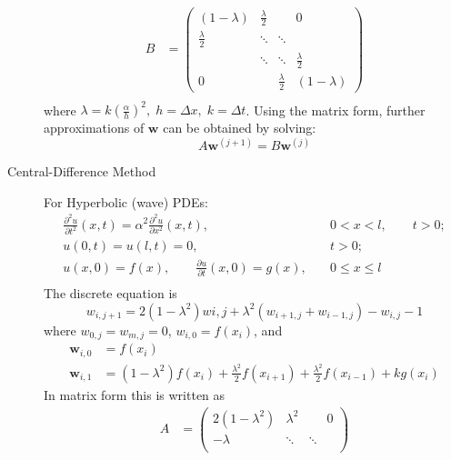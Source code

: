 \documentclass[8pt]{article}
\begin{document}
\begin{multicols}{2}
\begin{description}
\begin{equation*}
\begin{aligned}
        B&=
        \begin{pmatrix}
          (1-\lambda) & \frac{\lambda}{2} & & 0\\
          \frac{\lambda}{2} & \ddots & \ddots & \\
          & \ddots & \ddots & \frac{\lambda}{2}\\
          0 & & \frac{\lambda}{2} & (1-\lambda)
        \end{pmatrix} \\
      \end{aligned}
    \end{equation*}
    where $\lambda = k\left(\frac{\alpha}{h}\right)^2,\;h=\Delta
    x,\;k=\Delta t$. Using the matrix form, further approximations of
    $\mathbf{w}$ can be obtained by solving:
    $$ A\mathbf{w}^{(j+1)} = B\mathbf{w}^{(j)} $$
  \item[Central-Difference Method] For Hyperbolic (wave) PDEs:
    \begin{equation*}
      \begin{aligned}
        &\frac{\partial^2u}{\partial t^2}(x,t) =
        \alpha^2\frac{\partial^2u}{\partial x^2}(x,t),
        &0<x<l, \qquad t>0; \\
        &u(0,t)=u(l,t)=0,\quad &t>0; \\
        &u(x,0)=f(x),\qquad \frac{\partial u}{\partial t}(x,0)=g(x), \quad &0\leq x\leq
        l& \\
      \end{aligned}
    \end{equation*}
    The discrete equation is
    $$ w_{i,j+1} = 2(1-\lambda^2)w{i,j} + \lambda^2(w_{i+1,j}+w_{i-1,j})-w_{i,j}-1 $$
    where $w_{0,j}=w_{m,j}=0$, $w_{i,0}=f(x_i)$, and
    \begin{equation*}
      \begin{aligned}
        \mathbf{w}_{i,0} &= f(x_i) \\
        \mathbf{w}_{i,1} &=
        (1-\lambda^2)f(x_i)+\frac{\lambda^2}{2}f(x_{i+1}) +
        \frac{\lambda^2}{2}f(x_{i-1}) + kg(x_i)
      \end{aligned}
    \end{equation*}
    In matrix form this is written as
    \begin{equation*}
      \begin{aligned}
        A&=
        \begin{pmatrix}
            2(1-\lambda^2) & \lambda^2 & & 0\\
            -\lambda& \ddots & \ddots & \\

\end{pmatrix}
\end{aligned}
\end{equation*}
\end{description}
\end{multicols}
\end{document}

